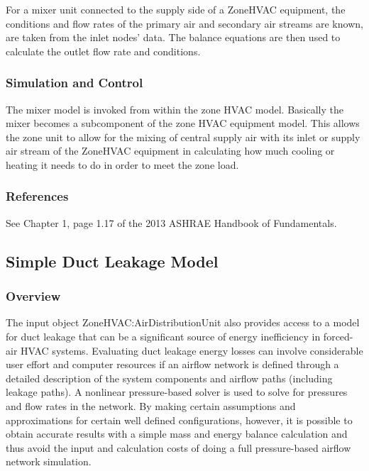 For a mixer unit connected to the supply side of a ZoneHVAC equipment, the conditions and flow rates of the primary air and secondary air streams are known, are taken from the inlet nodes' data. The balance equations are then used to calculate the outlet flow rate and conditions.

\subsubsection{Simulation and Control}\label{simulation-and-control-1-002}

The mixer model is invoked from within the zone HVAC model. Basically the mixer becomes a subcomponent of the zone HVAC equipment model. This allows the zone unit to allow for the mixing of central supply air with its inlet or supply air stream of the ZoneHVAC equipment in calculating how much cooling or heating it needs to do in order to meet the zone load.

\subsubsection{References}\label{references-1-020}

See Chapter 1, page 1.17 of the 2013 ASHRAE Handbook of Fundamentals.


\subsection{Simple Duct Leakage Model}\label{simple-duct-leakage-model}

\subsubsection{Overview}\label{overview-3-005}

The input object ZoneHVAC:AirDistributionUnit also provides access to a model for duct leakage that can be a significant source of energy inefficiency in forced-air HVAC systems. Evaluating duct leakage energy losses can involve considerable user effort and computer resources if an airflow network is defined through a detailed description of the system components and airflow paths (including leakage paths). A nonlinear pressure-based solver is used to solve for pressures and flow rates in the network. By making certain assumptions and approximations for certain well defined configurations, however, it is possible to obtain accurate results with a simple mass and energy balance calculation and thus avoid the input and calculation costs of doing a full pressure-based airflow network simulation.

